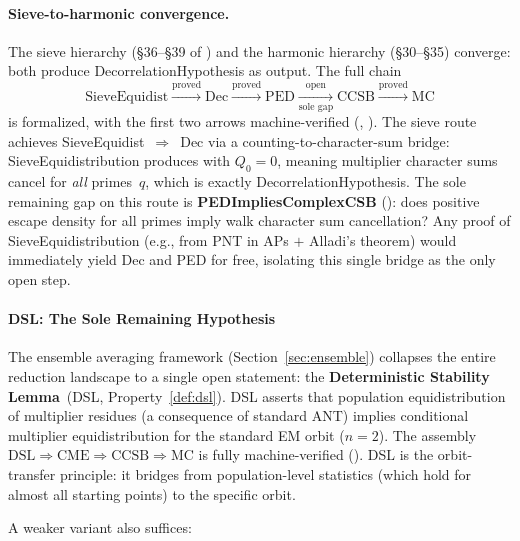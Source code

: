 \paragraph{Sieve-to-harmonic convergence.}

The sieve hierarchy (\S36--\S39 of )
and the harmonic hierarchy (\S30--\S35) converge: both produce
DecorrelationHypothesis as output.  The full chain
\[
\mathrm{SieveEquidist}
\xrightarrow{\text{proved}}
\mathrm{Dec}
\xrightarrow{\text{proved}}
\mathrm{PED}
\xrightarrow[\text{sole gap}]{\text{open}}
\mathrm{CCSB}
\xrightarrow{\text{proved}}
\mathrm{MC}
\]
is formalized, with the first two arrows machine-verified
(,
).
The sieve route achieves SieveEquidist~$\Rightarrow$~Dec via a
counting-to-character-sum bridge: SieveEquidistribution produces
 with $Q_0 = 0$, meaning multiplier character
sums cancel for \emph{all} primes~$q$, which is exactly
DecorrelationHypothesis.  The sole remaining gap on this route is
\textbf{PEDImpliesComplexCSB}
():
does positive escape density for all primes imply walk character sum
cancellation?  Any proof of SieveEquidistribution (e.g., from PNT
in APs $+$ Alladi's theorem) would immediately yield Dec and PED
for free, isolating this single bridge as the only open step.

\paragraph{DSL: The Sole Remaining Hypothesis}

The ensemble averaging framework (Section~\ref{sec:ensemble}) collapses
the entire reduction landscape to a single open statement:
the \textbf{Deterministic Stability Lemma}~(DSL,
Property~\ref{def:dsl}).  DSL asserts that population
equidistribution of multiplier residues (a consequence of standard
ANT) implies conditional multiplier equidistribution for the
standard EM orbit ($n = 2$).  The assembly
$\mathrm{DSL} \Rightarrow \mathrm{CME} \Rightarrow \mathrm{CCSB}
\Rightarrow \mathrm{MC}$
is fully machine-verified
().
DSL is the orbit-transfer principle: it bridges from population-level
statistics (which hold for almost all starting points) to the specific
orbit.

A weaker variant also suffices:

